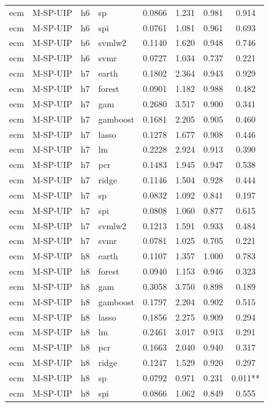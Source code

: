 \begin{ThreePartTable}
\begin{longtable}[t]{llclcccc}
ecm & M-SP-UIP & h6 & sp & 0.0866 & 1.231 & 0.981 & 0.914\\
ecm & M-SP-UIP & h6 & spi & 0.0761 & 1.081 & 0.961 & 0.693\\
ecm & M-SP-UIP & h6 & svmlw2 & 0.1140 & 1.620 & 0.948 & 0.746\\
ecm & M-SP-UIP & h6 & svmr & 0.0727 & 1.034 & 0.737 & 0.221\\
\addlinespace
ecm & M-SP-UIP & h7 & earth & 0.1802 & 2.364 & 0.943 & 0.929\\
ecm & M-SP-UIP & h7 & forest & 0.0901 & 1.182 & 0.988 & 0.482\\
ecm & M-SP-UIP & h7 & gam & 0.2680 & 3.517 & 0.900 & 0.341\\
ecm & M-SP-UIP & h7 & gamboost & 0.1681 & 2.205 & 0.905 & 0.460\\
ecm & M-SP-UIP & h7 & lasso & 0.1278 & 1.677 & 0.908 & 0.446\\
ecm & M-SP-UIP & h7 & lm & 0.2228 & 2.924 & 0.913 & 0.390\\
ecm & M-SP-UIP & h7 & pcr & 0.1483 & 1.945 & 0.947 & 0.538\\
ecm & M-SP-UIP & h7 & ridge & 0.1146 & 1.504 & 0.928 & 0.444\\
ecm & M-SP-UIP & h7 & sp & 0.0832 & 1.092 & 0.841 & 0.197\\
ecm & M-SP-UIP & h7 & spi & 0.0808 & 1.060 & 0.877 & 0.615\\
ecm & M-SP-UIP & h7 & svmlw2 & 0.1213 & 1.591 & 0.933 & 0.484\\
ecm & M-SP-UIP & h7 & svmr & 0.0781 & 1.025 & 0.705 & 0.221\\
\addlinespace
ecm & M-SP-UIP & h8 & earth & 0.1107 & 1.357 & 1.000 & 0.783\\
ecm & M-SP-UIP & h8 & forest & 0.0940 & 1.153 & 0.946 & 0.323\\
ecm & M-SP-UIP & h8 & gam & 0.3058 & 3.750 & 0.898 & 0.189\\
ecm & M-SP-UIP & h8 & gamboost & 0.1797 & 2.204 & 0.902 & 0.515\\
ecm & M-SP-UIP & h8 & lasso & 0.1856 & 2.275 & 0.909 & 0.294\\
ecm & M-SP-UIP & h8 & lm & 0.2461 & 3.017 & 0.913 & 0.291\\
ecm & M-SP-UIP & h8 & pcr & 0.1663 & 2.040 & 0.940 & 0.317\\
ecm & M-SP-UIP & h8 & ridge & 0.1247 & 1.529 & 0.920 & 0.297\\
ecm & M-SP-UIP & h8 & sp & 0.0792 & 0.971 & 0.231 & 0.011**\\
ecm & M-SP-UIP & h8 & spi & 0.0866 & 1.062 & 0.849 & 0.555\\

\end{longtable}
\end{ThreePartTable}
